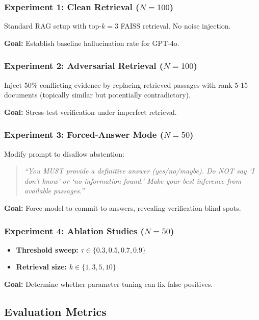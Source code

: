 \documentclass[11pt]{article}
\begin{document}
\subsubsection{Experiment 1: Clean Retrieval ($N=100$)}

Standard RAG setup with top-$k=3$ FAISS retrieval. No noise injection.

\textbf{Goal:} Establish baseline hallucination rate for GPT-4o.

\subsubsection{Experiment 2: Adversarial Retrieval ($N=100$)}

Inject 50\% conflicting evidence by replacing retrieved passages with rank 5-15 documents (topically similar but potentially contradictory).

\textbf{Goal:} Stress-test verification under imperfect retrieval.

\subsubsection{Experiment 3: Forced-Answer Mode ($N=50$)}

Modify prompt to disallow abstention:
\begin{quote}
\textit{``You MUST provide a definitive answer (yes/no/maybe). Do NOT say `I don't know' or `no information found.' Make your best inference from available passages.''}
\end{quote}

\textbf{Goal:} Force model to commit to answers, revealing verification blind spots.

\subsubsection{Experiment 4: Ablation Studies ($N=50$)}

\begin{itemize}
\item \textbf{Threshold sweep:} $\tau \in \{0.3, 0.5, 0.7, 0.9\}$
\item \textbf{Retrieval size:} $k \in \{1, 3, 5, 10\}$
\end{itemize}

\textbf{Goal:} Determine whether parameter tuning can fix false positives.

\subsection{Evaluation Metrics}
\end{document}
